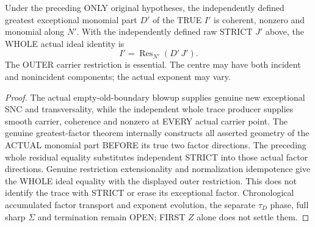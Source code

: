 \begin{theorem}
\label{hir:sharp-actual-mixed-discrete-whole-ambient-trace-greatest-factor}
\leanok
Under the preceding ONLY original hypotheses, the independently defined
greatest exceptional monomial part $D'$ of the TRUE $I'$ is coherent,
nonzero and monomial along $N'$. With the independently defined raw STRICT
$J'$ above, the WHOLE actual ideal identity is
\[
 I'=\operatorname{Res}_{N'}(D'\,J').
\]
The OUTER carrier restriction is essential. The centre may have both
incident and nonincident components; the actual exponent may vary.
\end{theorem}
\begin{proof}
The actual empty-old-boundary blowup supplies genuine new exceptional SNC
and transversality, while the independent whole trace producer supplies
smooth carrier, coherence and nonzero at EVERY actual carrier point.
The genuine greatest-factor theorem internally constructs all asserted
geometry of the ACTUAL monomial part BEFORE its true two factor directions.
The preceding whole residual equality substitutes independent STRICT into
those actual factor directions. Genuine restriction extensionality and
normalization idempotence give the WHOLE ideal equality with the displayed
outer restriction. This does not identify the trace with STRICT or erase
its exceptional factor. Chronological accumulated factor transport and
exponent evolution, the separate $\tau_D$ phase, full sharp $\Sigma$ and
termination remain OPEN; FIRST $Z$ alone does not settle them.
\end{proof}

